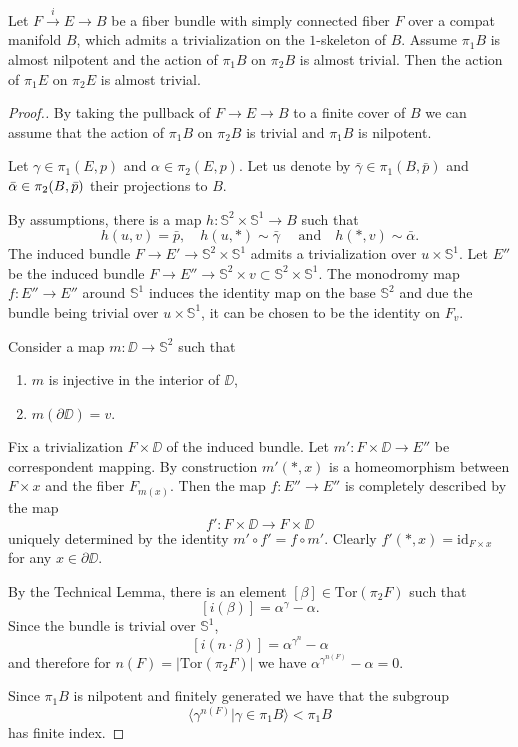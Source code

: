 \documentclass{amsart}
\begin{document}
\begin{claim}
Let $F\xrightarrow{i} E\to B$ be a fiber bundle with 
simply connected fiber $F$ over a compat manifold $B$, 
which admits a trivialization on the $1$-skeleton of $B$. 
Assume $\pi_1B$ is almost nilpotent 
and the action of $\pi_1B$ on $\pi_2B$ is almost trivial. 
Then  the action of $\pi_1E$ on $\pi_2E$ is almost trivial.
\end{claim}

\begin{proof}[Proof.] 
By taking the pullback of $F\to E\to B$ to a finite cover of $B$ we can assume that  the action of $\pi_1B$ on $\pi_2B$ is trivial and $\pi_1B$ is nilpotent.

Let $\gamma\in \pi_1(E,p)$ and $\alpha\in \pi_2(E,p)$. 
Let us denote by $\bar\gamma\in \pi_1(B,\bar p)$ and 
$\bar\alpha\z\in \pi_2(B,\bar p)$ their projections to $B$.

By assumptions, there is a map
$h\colon \mathbb{S}^2\times \mathbb{S}^1\to B$ such that 
$$h(u,v)=\bar p,\quad
h(u,*)\sim\bar\gamma\quad\text{ and}\quad
h(*,v)\sim\bar\alpha.$$
The induced bundle $F\to E'\to \mathbb{S}^2\times \mathbb{S}^1$ admits a 
trivialization over $u\times \mathbb{S}^1$.
Let $E''$ be the  induced bundle $F\to E''\to \mathbb{S}^2\times v\subset \mathbb{S}^2\times \mathbb{S}^1$.
The  monodromy map $f\colon E''\to E''$ around $\mathbb{S}^1$
induces the  identity map on the base $\mathbb{S}^2$ 
and due the bundle being trivial  over $u\times \mathbb{S}^1$,
it  can be chosen to be the identity on $F_v$.

Consider a map $m\colon \DD\to \mathbb{S}^2$ such that 
\begin{enumerate}[(1)]
\item  $m$ is injective in the interior of $\DD$, 
\item  $m(\partial \DD)=v$.
\end{enumerate}
Fix a trivialization 
$F\times \DD$ of the induced bundle. 
Let 
$m'\colon F\times \DD\to E''$ be correspondent mapping. 
By construction $m'(*,x)$ is a homeomorphism  between $F\times x$ and the fiber $F_{m(x)}$.
Then the map $f\colon E''\to E''$ is completely described by the map 
$$f'\colon F\times \DD\to F\times \DD $$ 
uniquely determined  by the  identity
$m'\circ f'=f\circ m'$. 
Clearly $f'(*,x)=\mathrm{id}_{F\times x}$ 
for any $x\in\partial \DD$.

By the Technical Lemma, there is an element 
$[\beta]\in \mathrm{Tor}(\pi_2F)$ such that 
\[[i(\beta)]=\alpha^\gamma-\alpha.\]
Since the bundle is trivial over $\mathbb{S}^1$,
\[[i(n{\cdot} \beta)]=\alpha^{\gamma^n}-\alpha\] and therefore for $n(F)=|\mathrm{Tor}(\pi_2F)|$ we have 
$\alpha^{\gamma^{n(F)}}-\alpha=0$. 

Since $\pi_1B$ is nilpotent and finitely generated we have that the subgroup  \[\langle\gamma^{n(F)}|\gamma\in \pi_1B\rangle<\pi_1B\] 
has finite index.
\end{proof}
\end{document}
